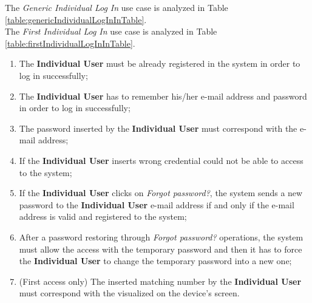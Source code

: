 The \textit{Generic Individual Log In} use case is analyzed in Table \ref{table:genericIndividualLogInInTable}.\\
The \textit{First Individual Log In} use case is analyzed in Table \ref{table:firstIndividualLogInInTable}.

\begin{enumerate}
  \item The \textbf{Individual User} must be already registered in the system in order to log in successfully;
  \item The \textbf{Individual User} has to remember his/her e-mail address and password in order to log in successfully;
  \item The password inserted by the \textbf{Individual User} must correspond with the e-mail address;
  \item If the \textbf{Individual User} inserts wrong credential could not be able to access to the system;
  \item If the \textbf{Individual User} clicks on \textit{Forgot password?}, the system sends a new password to the \textbf{Individual User} e-mail address if and only if the e-mail address is valid and registered to the system;
  \item After a password restoring through \textit{Forgot password?} operations, the system must allow the access with the temporary password and then it has to force the \textbf{Individual User} to change the temporary password into a new one;
  \item (First access only) The inserted matching number by the \textbf{Individual User} must correspond with the visualized on the device's screen.
\end{enumerate}

